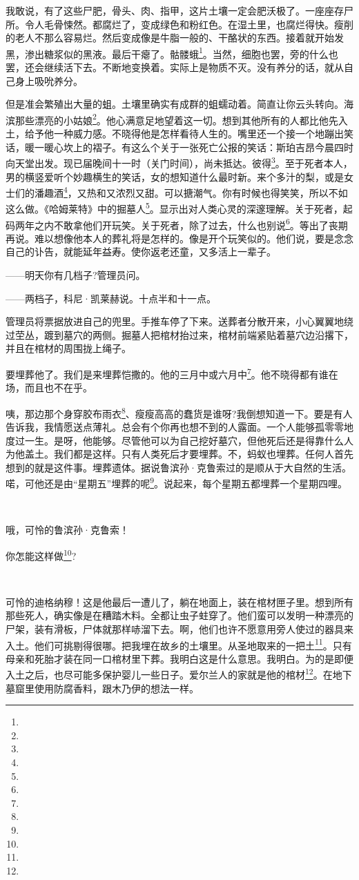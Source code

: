 \par 我敢说，有了这些尸肥，骨头、肉、指甲，这片土壤一定会肥沃极了。一座座存尸所。令人毛骨悚然。都腐烂了，变成绿色和粉红色。在湿土里，也腐烂得快。瘦削的老人不那么容易烂。然后变成像是牛脂一般的、干酪状的东西。接着就开始发黑，渗出糖浆似的黑液。最后干瘪了。骷髅蛾\footnote{}。当然，细胞也罢，旁的什么也罢，还会继续活下去。不断地变换着。实际上是物质不灭。没有养分的话，就从自己身上吸吮养分。
\par 但是准会繁殖出大量的蛆。土壤里确实有成群的蛆蠕动着。简直让你云头转向。海滨那些漂亮的小姑娘\footnote{}。他心满意足地望着这一切。想到其他所有的人都比他先入土，给予他一种威力感。不晓得他是怎样看待人生的。嘴里还一个接一个地蹦出笑话，暖一暖心坎上的褶子。有这么个关于一张死亡公报的笑话：斯珀吉昂今晨四时向天堂出发。现已届晚间十一时（关门时间），尚未抵达。彼得\footnote{}。至于死者本人，男的横竖爱听个妙趣横生的笑话，女的想知道什么最时新。来个多汁的梨，或是女士们的潘趣酒\footnote{}，又热和又浓烈又甜。可以搪潮气。你有时候也得笑笑，所以不如这么做。《哈姆莱特》中的掘墓人\footnote{}。显示出对人类心灵的深邃理解。关于死者，起码两年之内不敢拿他们开玩笑。关于死者，除了过去，什么也别说\footnote{}。等出了丧期再说。难以想像他本人的葬礼将是怎样的。像是开个玩笑似的。他们说，要是念念自己的讣告，就能延年益寿。使你返老还童，又多活上一辈子。
\par ——明天你有几档子?管理员问。
\par ——两档子，科尼·凯莱赫说。十点半和十一点。
\par 管理员将票据放进自己的兜里。手推车停了下来。送葬者分散开来，小心翼翼地绕过茔丛，踱到墓穴的两侧。掘墓人把棺材抬过来，棺材前端紧贴着墓穴边沿撂下，并且在棺材的周围拢上绳子。
\par 要埋葬他了。我们是来埋葬恺撒的。他的三月中或六月中\footnote{}。他不晓得都有谁在场，而且也不在乎。
\par 咦，那边那个身穿胶布雨衣\footnote{}、瘦瘦高高的蠢货是谁呀?我倒想知道一下。要是有人告诉我，我情愿送点薄礼。总会有个你再也想不到的人露面。一个人能够孤零零地度过一生。是呀，他能够。尽管他可以为自己挖好墓穴，但他死后还是得靠什么人为他盖土。我们都是这样。只有人类死后才要埋葬。不，蚂蚁也埋葬。任何人首先想到的就是这件事。埋葬遗体。据说鲁滨孙·克鲁索过的是顺从于大自然的生活。喏，可他还是由“星期五”埋葬的呢\footnote{}。说起来，每个星期五都埋葬一个星期四哩。
\par  
\par 哦，可怜的鲁滨孙·克鲁索！
\par 你怎能这样做\footnote{}?
\par  
\par 可怜的迪格纳穆！这是他最后一遭儿了，躺在地面上，装在棺材匣子里。想到所有那些死人，确实像是在糟踏木料。全都让虫子蛀穿了。他们蛮可以发明一种漂亮的尸架，装有滑板，尸体就那样哧溜下去。啊，他们也许不愿意用旁人使过的器具来入土。他们可挑剔得很哪。把我埋在故乡的土壤里。从圣地取来的一把土\footnote{}。只有母亲和死胎才装在同一口棺材里下葬。我明白这是什么意思。我明白。为的是即便入土之后，也尽可能多保护婴儿一些日子。爱尔兰人的家就是他的棺材\footnote{}。在地下墓窟里使用防腐香料，跟木乃伊的想法一样。
